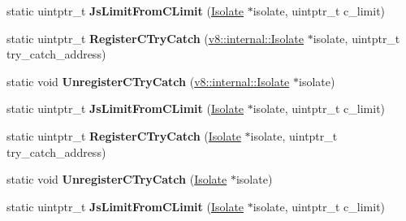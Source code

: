 \begin{DoxyCompactItemize}
\item 
static uintptr\+\_\+t {\bfseries Js\+Limit\+From\+C\+Limit} (\hyperlink{classv8_1_1internal_1_1_isolate}{Isolate} $\ast$isolate, uintptr\+\_\+t c\+\_\+limit)\hypertarget{classv8_1_1internal_1_1_simulator_stack_a093b55e95fcd0c97eb2c1c262b893a08}{}\label{classv8_1_1internal_1_1_simulator_stack_a093b55e95fcd0c97eb2c1c262b893a08}

\item 
static uintptr\+\_\+t {\bfseries Register\+C\+Try\+Catch} (\hyperlink{classv8_1_1internal_1_1_isolate}{v8\+::internal\+::\+Isolate} $\ast$isolate, uintptr\+\_\+t try\+\_\+catch\+\_\+address)\hypertarget{classv8_1_1internal_1_1_simulator_stack_a6f431175b70dcc1afd95dcc3bc9905a7}{}\label{classv8_1_1internal_1_1_simulator_stack_a6f431175b70dcc1afd95dcc3bc9905a7}

\item 
static void {\bfseries Unregister\+C\+Try\+Catch} (\hyperlink{classv8_1_1internal_1_1_isolate}{v8\+::internal\+::\+Isolate} $\ast$isolate)\hypertarget{classv8_1_1internal_1_1_simulator_stack_aba310aee87eed385313d42cbc30dcd8a}{}\label{classv8_1_1internal_1_1_simulator_stack_aba310aee87eed385313d42cbc30dcd8a}

\item 
static uintptr\+\_\+t {\bfseries Js\+Limit\+From\+C\+Limit} (\hyperlink{classv8_1_1internal_1_1_isolate}{Isolate} $\ast$isolate, uintptr\+\_\+t c\+\_\+limit)\hypertarget{classv8_1_1internal_1_1_simulator_stack_a093b55e95fcd0c97eb2c1c262b893a08}{}\label{classv8_1_1internal_1_1_simulator_stack_a093b55e95fcd0c97eb2c1c262b893a08}

\item 
static uintptr\+\_\+t {\bfseries Register\+C\+Try\+Catch} (\hyperlink{classv8_1_1internal_1_1_isolate}{Isolate} $\ast$isolate, uintptr\+\_\+t try\+\_\+catch\+\_\+address)\hypertarget{classv8_1_1internal_1_1_simulator_stack_aa65ef6412ce0b3fd2c27fa870162524b}{}\label{classv8_1_1internal_1_1_simulator_stack_aa65ef6412ce0b3fd2c27fa870162524b}

\item 
static void {\bfseries Unregister\+C\+Try\+Catch} (\hyperlink{classv8_1_1internal_1_1_isolate}{Isolate} $\ast$isolate)\hypertarget{classv8_1_1internal_1_1_simulator_stack_a88b1641de138b2d8eb764f9d71f601c8}{}\label{classv8_1_1internal_1_1_simulator_stack_a88b1641de138b2d8eb764f9d71f601c8}

\item 
static uintptr\+\_\+t {\bfseries Js\+Limit\+From\+C\+Limit} (\hyperlink{classv8_1_1internal_1_1_isolate}{Isolate} $\ast$isolate, uintptr\+\_\+t c\+\_\+limit)\hypertarget{classv8_1_1internal_1_1_simulator_stack_a093b55e95fcd0c97eb2c1c262b893a08}{}\label{classv8_1_1internal_1_1_simulator_stack_a093b55e95fcd0c97eb2c1c262b893a08}


\end{DoxyCompactItemize}

